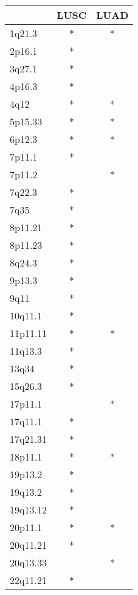 \begin{tabular}{lcc}
\toprule
{} & LUSC & LUAD \\
\midrule
1q21.3   &    * &    * \\
2p16.1   &    * &      \\
3q27.1   &    * &      \\
4p16.3   &    * &      \\
4q12     &    * &    * \\
5p15.33  &    * &    * \\
6p12.3   &    * &    * \\
7p11.1   &    * &      \\
7p11.2   &      &    * \\
7q22.3   &    * &      \\
7q35     &    * &      \\
8p11.21  &    * &      \\
8p11.23  &    * &      \\
8q24.3   &    * &      \\
9p13.3   &    * &      \\
9q11     &    * &      \\
10q11.1  &    * &      \\
11p11.11 &    * &    * \\
11q13.3  &    * &      \\
13q34    &    * &      \\
15q26.3  &    * &      \\
17p11.1  &      &    * \\
17q11.1  &    * &      \\
17q21.31 &    * &      \\
18p11.1  &    * &    * \\
19p13.2  &    * &      \\
19q13.2  &    * &      \\
19q13.12 &    * &      \\
20p11.1  &    * &    * \\
20q11.21 &    * &      \\
20q13.33 &      &    * \\
22q11.21 &    * &      \\
\bottomrule
\end{tabular}
